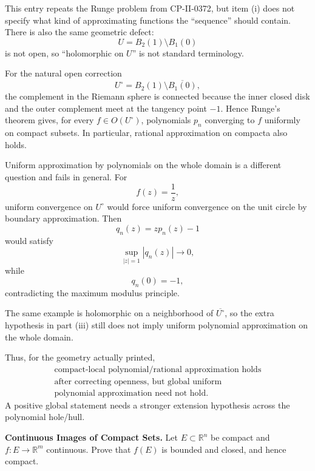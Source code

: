 \begin{solution}
This entry repeats the Runge problem from CP-II-0372, but item (i) does not specify what kind
of approximating functions the ``sequence'' should contain. There is also the same geometric
defect:
\[
U=B_2(1)\setminus B_1(0)
\]
is not open, so ``holomorphic on \(U\)'' is not standard terminology.

For the natural open correction
\[
U^\circ
=
B_2(1)\setminus\overline{B_1(0)},
\]
the complement in the Riemann sphere is connected because the inner closed disk and the
outer complement meet at the tangency point \(-1\). Hence Runge's theorem gives, for every
\(f\in O(U^\circ)\), polynomials \(p_n\) converging to \(f\) uniformly on compact subsets.
In particular, rational approximation on compacta also holds.

Uniform approximation by polynomials on the whole domain is a different question and fails
in general. For
\[
f(z)=\frac1z,
\]
uniform convergence on \(U^\circ\) would force uniform convergence on the unit circle by
boundary approximation. Then
\[
q_n(z)=zp_n(z)-1
\]
would satisfy
\[
\sup_{|z|=1}|q_n(z)|\to0,
\]
while
\[
q_n(0)=-1,
\]
contradicting the maximum modulus principle.

The same example is holomorphic on a neighborhood of \(\overline{U^\circ}\), so the extra
hypothesis in part (iii) still does not imply uniform polynomial approximation on the whole
domain.

Thus, for the geometry actually printed,
\[
\boxed{\begin{gathered}
\text{compact-local polynomial/rational approximation holds}
\\
\text{after correcting openness, but global uniform}
\\
\text{polynomial approximation need not hold.}
\end{gathered}}
\]
A positive global statement needs a stronger extension hypothesis across the polynomial
hole/hull.
\end{solution}


\begin{problem}[CP-II-0467]
\label{prob:cp-ii-0467}
\textbf{Continuous Images of Compact Sets.}
Let \(E\subset\mathbb R^n\) be compact and \(f:E\to\mathbb R^m\) continuous. Prove that \(f(E)\) is bounded and closed, and hence compact.
\end{problem}

